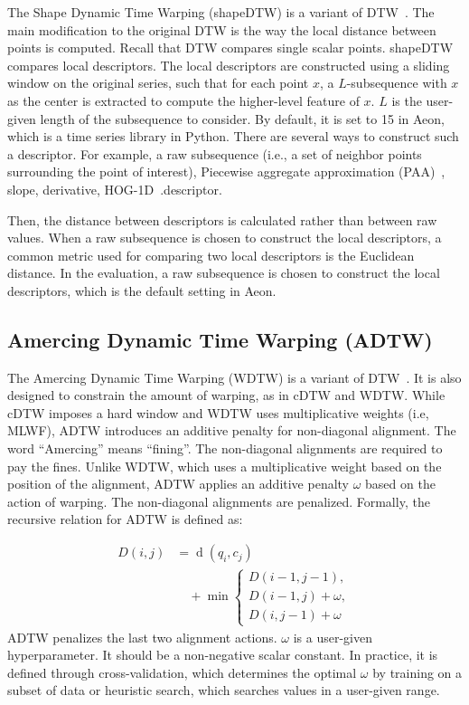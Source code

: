 The Shape Dynamic Time Warping (shapeDTW) is a variant of DTW~\cite{zhao2018shapedtw}.
The main modification to the original DTW is the way the local distance between points is computed.
Recall that DTW compares single scalar points.
shapeDTW compares local descriptors.
The local descriptors are constructed using a sliding window on the original series, such that for each point $x$, a $L$-subsequence with $x$ as the center is extracted to compute the higher-level feature of $x$. $L$ is the user-given length of the subsequence to consider. By default, it is set to 15 in Aeon, which is a time series library in Python.
There are several ways to construct such a descriptor.
For example, a raw subsequence (i.e., a set of neighbor points surrounding the point of interest), Piecewise aggregate approximation (PAA)~\cite{keogh2001dimensionality, yi2000fast}, slope, derivative, HOG-1D~\cite{zhao2016decomposing}.descriptor.

Then, the distance between descriptors is calculated rather than between raw values.
When a raw subsequence is chosen to construct the local descriptors, a common metric used for comparing two local descriptors is the Euclidean distance.
In the evaluation, a raw subsequence is chosen to construct the local descriptors, which is the default setting in Aeon.

\subsection{Amercing Dynamic Time Warping (ADTW)} %

The Amercing Dynamic Time Warping (WDTW) is a variant of DTW~\cite{herrmann2023amercing}.
It is also designed to constrain the amount of warping, as in cDTW and WDTW.
While cDTW imposes a hard window and WDTW uses multiplicative weights (i.e, MLWF), ADTW introduces an additive penalty for non-diagonal alignment.
The word ``Amercing'' means ``fining''.
The non-diagonal alignments are required to pay the fines.
Unlike WDTW, which uses a multiplicative weight based on the position of the alignment, ADTW applies an additive penalty $\omega$ based on the action of warping.
The non-diagonal alignments are penalized.
Formally, the recursive relation for ADTW is defined as:

\begin{equation}
\begin{split}
    D(i, j) &= \operatorname{d}(q_i, c_j) \\
    &\quad + \min \begin{cases}
        D(i-1, j-1), \\
        D(i-1, j) + \omega, \\
        D(i, j-1) + \omega
    \end{cases}
\end{split}
\end{equation}
ADTW penalizes the last two alignment actions.
$\omega$ is a user-given hyperparameter.
It should be a non-negative scalar constant.
In practice, it is defined through cross-validation, which determines the optimal $\omega$ by training on a subset of data or heuristic search, which searches values in a user-given range.

